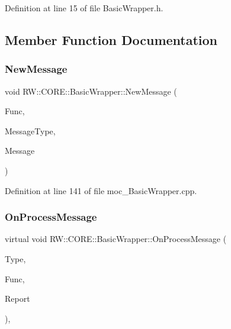 Definition at line 15 of file Basic\+Wrapper.\+h.



\subsection{Member Function Documentation}
\hypertarget{class_r_w_1_1_c_o_r_e_1_1_basic_wrapper_a9c59f7978bd65b16bff623f414fab06f}{}\label{class_r_w_1_1_c_o_r_e_1_1_basic_wrapper_a9c59f7978bd65b16bff623f414fab06f} 
\subsubsection{\texorpdfstring{New\+Message}{NewMessage}}
{\footnotesize\ttfamily void R\+W\+::\+C\+O\+R\+E\+::\+Basic\+Wrapper\+::\+New\+Message (\begin{DoxyParamCaption}\item[{Util\+::\+Functions}]{Func,  }\item[{Util\+::\+Error\+ID}]{Message\+Type,  }\item[{Q\+Byte\+Array}]{Message }\end{DoxyParamCaption})\hspace{0.3cm}{\ttfamily [signal]}}



Definition at line 141 of file moc\+\_\+\+Basic\+Wrapper.\+cpp.

\hypertarget{class_r_w_1_1_c_o_r_e_1_1_basic_wrapper_a8541942f3b9c66acbc86c2d4310c622b}{}\label{class_r_w_1_1_c_o_r_e_1_1_basic_wrapper_a8541942f3b9c66acbc86c2d4310c622b} 
\subsubsection{\texorpdfstring{On\+Process\+Message}{OnProcessMessage}}
{\footnotesize\ttfamily virtual void R\+W\+::\+C\+O\+R\+E\+::\+Basic\+Wrapper\+::\+On\+Process\+Message (\begin{DoxyParamCaption}\item[{Util\+::\+Message\+Receiver}]{Type,  }\item[{Util\+::\+Functions}]{Func,  }\item[{Q\+Byte\+Array}]{Report }\end{DoxyParamCaption})\hspace{0.3cm}{\ttfamily [pure virtual]}, {\ttfamily [slot]}}




